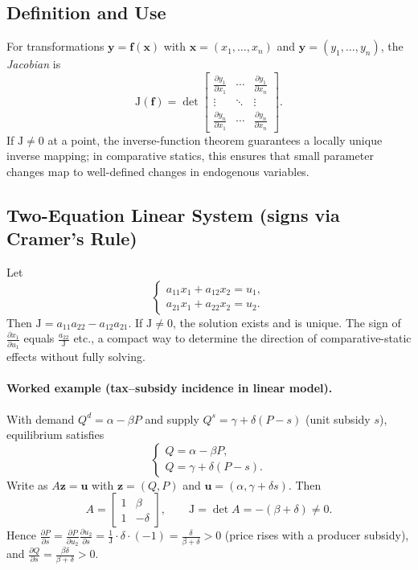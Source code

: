 \documentclass[11pt]{article}
\newcommand{\pd}[2]{\frac{\partial #1}{\partial #2}}
\newcommand{\Jac}{\mathrm{J}}
\newcommand{\vect}[1]{\mathbf{#1}}
\begin{document}
\subsection*{Definition and Use}
For transformations $\vect{y}=\vect{f}(\vect{x})$ with $\vect{x}=(x_1,\dots,x_n)$ and $\vect{y}=(y_1,\dots,y_n)$, the \emph{Jacobian} is
\[
\Jac(\vect{f})=\det
\begin{bmatrix}
\pd{y_1}{x_1} & \cdots & \pd{y_1}{x_n}\\
\vdots & \ddots & \vdots\\
\pd{y_n}{x_1} & \cdots & \pd{y_n}{x_n}
\end{bmatrix}.
\]
If $\Jac\neq 0$ at a point, the inverse-function theorem guarantees a locally unique inverse mapping; in comparative statics, this ensures that small parameter changes map to well-defined changes in endogenous variables.

\subsection*{Two-Equation Linear System (signs via Cramer's Rule)}
Let
\[
\begin{cases}
a_{11}x_1+a_{12}x_2=u_1,\\
a_{21}x_1+a_{22}x_2=u_2.
\end{cases}
\]
Then $\Jac=a_{11}a_{22}-a_{12}a_{21}$. If $\Jac\neq 0$, the solution exists and is unique. The sign of $\pd{x_1}{u_1}$ equals $\frac{a_{22}}{\Jac}$ etc., a compact way to determine the direction of comparative-static effects without fully solving.

\paragraph{Worked example (tax--subsidy incidence in linear model).}
With demand $Q^d=\alpha-\beta P$ and supply $Q^s=\gamma+\delta(P-s)$ (unit subsidy $s$), equilibrium satisfies
\[
\begin{cases}
Q = \alpha-\beta P,\\
Q = \gamma+\delta(P-s).
\end{cases}
\]
Write as $A\vect{z}=\vect{u}$ with $\vect{z}=(Q,P)$ and $\vect{u}=(\alpha,\gamma+\delta s)$.
Then
\[
A=\begin{bmatrix}
1 & \beta\\
1 & -\delta
\end{bmatrix},\qquad 
\Jac=\det A=-(\beta+\delta)\neq 0.
\]
Hence $\pd{P}{s}=\frac{\partial P}{\partial u_2}\frac{\partial u_2}{\partial s}
=\frac{1}{\Jac}\cdot\delta \cdot (-1)=\frac{\delta}{\beta+\delta}>0$ (price rises with a producer subsidy), and $\pd{Q}{s}=\frac{\beta\delta}{\beta+\delta}>0$.
\end{document}
